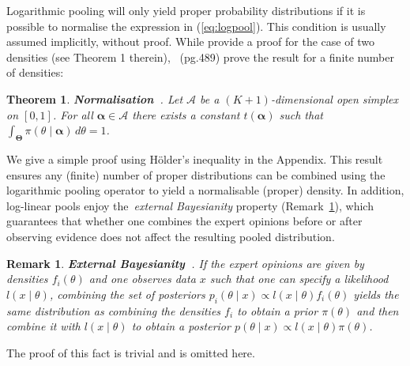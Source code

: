 \documentclass[a4paper, notitlepage, 11pt]{article}
\newtheorem{theo}{Theorem}[]
\newtheorem{remark}{Remark}[]
\begin{document}
Logarithmic pooling will only yield proper probability distributions if it is possible to normalise the expression in (\ref{eq:logpool}).
This condition is usually assumed implicitly, without proof.
While \citet{Poole2000} provide a proof for the case of two densities (see Theorem 1 therein),~\cite{Genest1986A} (pg.489) prove the result for a finite number of densities:
\begin{theo}
\label{thm:normalisation}
\textbf{Normalisation~\citep{Genest1986A}}. 
Let $\mathcal{A}$ be a $(K+1)$-dimensional open simplex on $[0,1]$.
For all $\boldsymbol\alpha \in \mathcal{A}$ there exists a constant $t(\boldsymbol\alpha)$ such that $\int_{\boldsymbol\Theta}\pi(\theta \mid \boldsymbol \alpha)\, d\theta = 1$.
\end{theo}
We give a simple proof using H\"{o}lder's inequality in the Appendix.
This result ensures any (finite) number of proper distributions can be combined using the logarithmic pooling operator to yield a normalisable (proper) density.
In addition, log-linear pools enjoy the~\textit{external Bayesianity} property (Remark~\ref{rmk:properties_EB}), which guarantees that whether one combines the expert opinions before or after observing evidence does not affect the resulting pooled distribution.
\begin{remark}
\label{rmk:properties_EB}
 \textbf{External Bayesianity~\citep{Genest1984B,Genest1984}}.
 If the expert opinions are given by densities $f_i(\theta)$ and one observes data $x$ such that one can specify a likelihood $l(x \mid \theta)$, combining the set of posteriors $p_i(\theta \mid x) \propto  l(x \mid \theta)f_i(\theta) $ yields the same distribution as combining the densities $f_i$ to obtain a prior $\pi(\theta)$ and then combine it with $l(x \mid \theta)$ to obtain a posterior $p(\theta \mid x) \propto l(x \mid \theta)\pi(\theta)$.
\end{remark}
 The proof of this fact is trivial and is omitted here.
\end{document}
